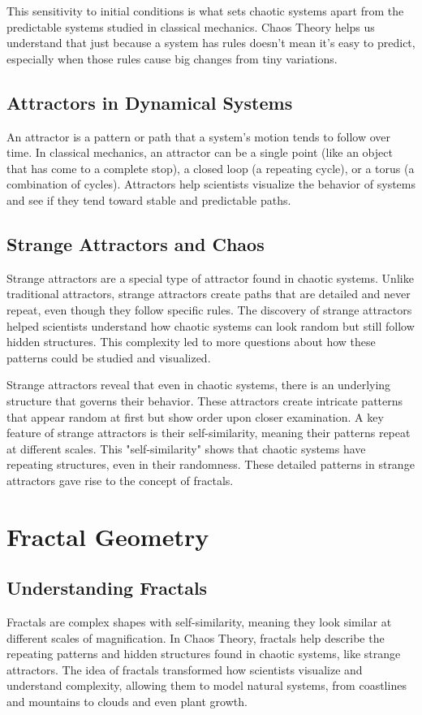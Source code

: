 \documentclass[12pt]{article}
\begin{document}
This sensitivity to initial conditions is what sets chaotic systems apart from the predictable systems studied in classical mechanics. Chaos Theory helps us understand that just because a system has rules doesn’t mean it’s easy to predict, especially when those rules cause big changes from tiny variations.


\subsection{Attractors in Dynamical Systems}
An attractor is a pattern or path that a system’s motion tends to follow over time. In classical mechanics, an attractor can be a single point (like an object that has come to a complete stop), a closed loop (a repeating cycle), or a torus (a combination of cycles). Attractors help scientists visualize the behavior of systems and see if they tend toward stable and predictable paths.

\subsection{Strange Attractors and Chaos}
Strange attractors are a special type of attractor found in chaotic systems. Unlike traditional attractors, strange attractors create paths that are detailed and never repeat, even though they follow specific rules. The discovery of strange attractors helped scientists understand how chaotic systems can look random but still follow hidden structures. This complexity led to more questions about how these patterns could be studied and visualized.

Strange attractors reveal that even in chaotic systems, there is an underlying structure that governs their behavior. These attractors create intricate patterns that appear random at first but show order upon closer examination. A key feature of strange attractors is their self-similarity, meaning their patterns repeat at different scales. This "self-similarity" shows that chaotic systems have repeating structures, even in their randomness. These detailed patterns in strange attractors gave rise to the concept of fractals.

\section{Fractal Geometry}
\subsection{Understanding Fractals}
Fractals are complex shapes with self-similarity, meaning they look similar at different scales of magnification. In Chaos Theory, fractals help describe the repeating patterns and hidden structures found in chaotic systems, like strange attractors. The idea of fractals transformed how scientists visualize and understand complexity, allowing them to model natural systems, from coastlines and mountains to clouds and even plant growth.
\end{document}
